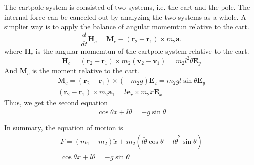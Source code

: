The cartpole system is consisted of two systems, i.e. the cart and the pole. The internal force can be canceled out by analyzing the two systems as a whole. A simplier way is to apply the balance of angular momemtun relative to the cart.
\begin{equation}
    \frac{d}{dt}\mathbf{H}_c = \mathbf{M}_c - (\mathbf{r}_2-\mathbf{r}_1)\times m_2\mathbf{a}_1
\end{equation}
where $\mathbf{H}_c$ is the angular momemtun of the cartpole system relative to the cart.
\begin{equation}
    \mathbf{H}_c = (\mathbf{r}_2-\mathbf{r}_1) \times m_2(\mathbf{v}_2 - \mathbf{v}_1) = m_2l^2\dot{\theta}\mathbf{E}_y
\end{equation}
And $\mathbf{M}_c$ is the moment relative to the cart.
\begin{align}
    \mathbf{M}_c = (\mathbf{r}_2-\mathbf{r}_1) \times (-m_2g)\mathbf{E}_z = m_2gl\sin\theta\mathbf{E}_y\\
    (\mathbf{r}_2-\mathbf{r}_1)\times m_2\mathbf{a}_1 = l\mathbf{e}_r \times m_2\ddot{x}\mathbf{E}_x
\end{align}
Thus, we get the second equation
\begin{equation}
    \cos\theta\ddot{x} + l\ddot{\theta} = -g\sin\theta
\end{equation}

In summary, the equation of motion is
\begin{align}
    F = (m_1+m_2)\ddot{x} + m_2(l\ddot{\theta}\cos\theta - l\dot{\theta}^2\sin\theta)\\
    \cos\theta\ddot{x} + l\ddot{\theta} = -g\sin\theta
\end{align}
